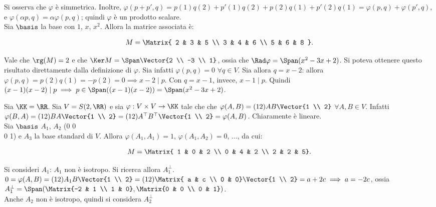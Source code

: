 \documentclass[11pt]{article}
\begin{document}
	\begin{solution}
		Si osserva che $\varphi$ è simmetrica. Inoltre, $\varphi(p + p', q) =
		p(1) q(2) + p'(1) q(2) + p(2) q(1) + p'(2) q(1) = \varphi(p, q) +
		\varphi(p', q)$, e $\varphi(\alpha p, q) = \alpha \varphi(p, q)$;
		quindi $\varphi$ è un prodotto scalare. \\
		
		Sia $\basis$ la base con $1$, $x$, $x^2$. Allora la matrice
		associata è:
		
		\[ M = \Matrix{ 2 & 3 &  5 \\ 3 & 4 & 6 \\ 5 & 6 & 8 }. \]
		
		Vale che $\rg(M) = 2$ e che $\Ker M = \Span\Vector{2 \\ -3 \\ 1}$,
		ossia che $\Rad \varphi = \Span(x^2-3x+2)$. Si poteva
		ottenere questo risultato direttamente dalla definizione di $\varphi$.
		Sia infatti $\varphi(p, q) = 0$ $\forall q \in V$. Sia allora
		$q = x-2$: allora $\varphi(p, q) = p(2) q(1) = -p(2) = 0 \implies
		x-2 \mid p$. Con $q = x-1$, invece, $x-1 \mid p$. Quindi $(x-1)(x-2) \mid p \implies p \in \Span((x-1)(x-2)) = \Span(x^2-3x+2)$.
	\end{solution}

	\begin{exercise}
		Sia $\KK = \RR$. Sia $V = S(2, \RR)$ e sia $\varphi : V \times V \to \KK$ tale che che $\varphi(A, B) = (1 2) A B \Vector{1 \\ 2}$ $\forall
		A, B \in V$. Infatti $\varphi(B, A) = (1 2) B A \Vector{1 \\ 2} =
		(1 2) A^\top B^\top \Vector{1 \\ 2} = \varphi(A, B)$. Chiaramente
		è lineare. \\
		
		Sia $\basis$ $A_1$, $A_2$ (0 0 \\ 0 1) e $A_3$ la base standard di $V$.
		Allora $\varphi(A_1, A_1) = 1$, $\varphi(A_1, A_2) = 0$, ..., da cui:
		
		\[ M = \Matrix{ 1 & 0 & 2 \\ 0 & 4 & 2 \\ 2 & 2 & 5}. \]
		
		Si consideri $A_1$: $A_1$ non è isotropo. Si ricerca allora
		$A_1^\perp$. $0 = \varphi(A, B) = (1 2) A_1 B \Vector{1 \\ 2} =
		(1 2) \Matrix{ a & c \\ 0 & 0} \Vector{1 \\ 2} = a + 2c \implies
		a = -2c$, ossia $A_1^\perp = \Span(\Matrix{-2 & 1 \\ 1 & 0},
		\Matrix{0 & 0 \\ 0 & 1})$. \\
		
		Anche $A_2$ non è isotropo, quindi si considera $A_2^\perp$
	\end{exercise}
\end{document}
